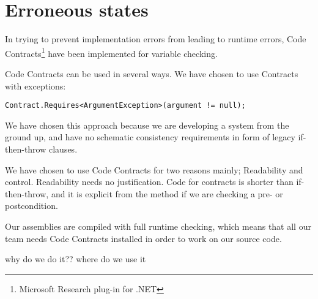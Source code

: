 \documentclass[../report.tex]{subfiles}
\begin{document}
\section{Erroneous states}

In trying to prevent implementation errors from leading to runtime errors, Code Contracts\footnote{Microsoft Research plug-in for .NET} have been implemented for variable checking.

Code Contracts can be used in several ways. We have chosen to use Contracts with  exceptions:

 \texttt{Contract.Requires<ArgumentException>(argument != null);}
 
We have chosen this approach because we are developing a system from the ground up, and have no schematic consistency requirements in form of legacy if-then-throw clauses.

We have chosen to use Code Contracts for two reasons mainly; Readability and control. Readability needs no justification. Code for contracts is shorter than if-then-throw, and it is explicit from the method if we are checking a pre- or postcondition.

Our assemblies are compiled with full runtime checking, which means that all our team needs Code Contracts installed in order to work on our source code.

why do we do it??
where do we use it
\end{document}
